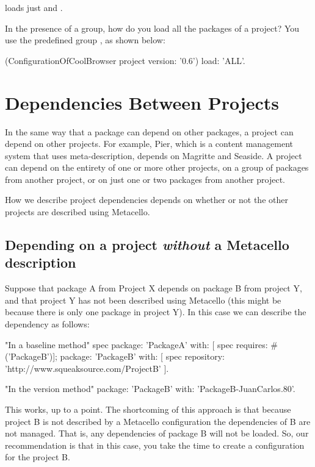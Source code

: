 \documentclass[a4paper,10pt,twoside]{book}
\begin{document}
\noindent
loads just  and .

In the presence of a  group, how do you load all the packages of a project?  You use the predefined group  , as shown below: 

\begin{code}{}
(ConfigurationOfCoolBrowser project version: '0.6') load: 'ALL'.
\end{code}
 

\section{Dependencies Between Projects}

In the same way that a package can depend on other packages, a project can depend on other projects.  For example, Pier, which is a content management system that uses meta-description, depends on Magritte and Seaside.  A project can depend on the entirety of one or more other projects, on a group of packages from another project, or on just one or two packages from another project.

How we describe project dependencies depends on whether or not the other projects are described using Metacello. 

\subsection{Depending on a project \emph{without} a Metacello description}

Suppose that package A from Project X depends on package B from project Y, and that project Y has not been described using Metacello (this might be because there is only one package in project Y). 
In this case we can describe the dependency as follows:
\begin{code}{}
      "In a baseline method"
      spec 
             package: 'PackageA' with: [  spec requires: #('PackageB')];
             package: 'PackageB' with: [  spec 
                   repository: 'http://www.squeaksource.com/ProjectB' ].       
\end{code}

\begin{code}{}
      "In the version method"
      package: 'PackageB' with: 'PackageB-JuanCarlos.80'.
\end{code}

This works, up to a point.  The shortcoming of this approach is that because  project B is not described by a Metacello configuration the dependencies of B are not managed. 
That is, any dependencies of package B will not be loaded. So, our recommendation is that in this case, you take the time to create a configuration for the project B.
\end{document}
